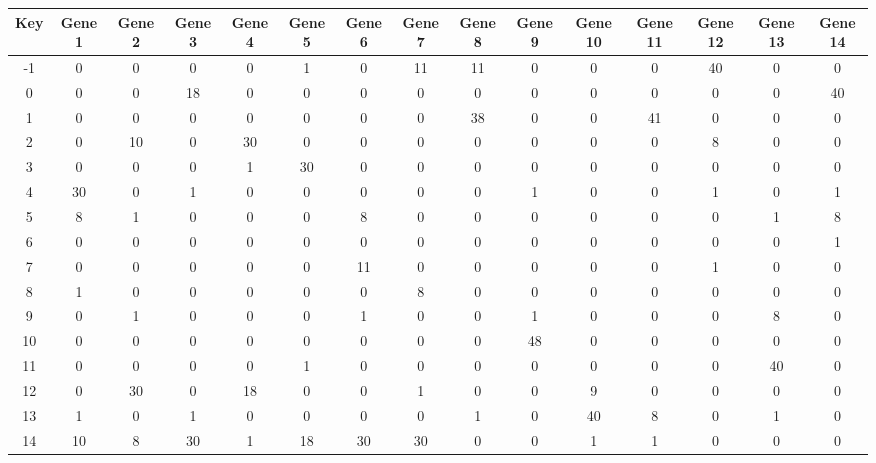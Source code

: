 \begin{tabular}{|c|c|c|c|c|c|c|c|c|c|c|c|c|c|c|}
\hline
Key & Gene 1 & Gene 2 & Gene 3 & Gene 4 & Gene 5 & Gene 6 & Gene 7 & Gene 8 & Gene 9 & Gene 10 & Gene 11 & Gene 12 & Gene 13 & Gene 14 \\
\hline
-1 & 0 & 0 & 0 & 0 & 1 & 0 & 11 & 11 & 0 & 0 & 0 & 40 & 0 & 0 \\
0 & 0 & 0 & 18 & 0 & 0 & 0 & 0 & 0 & 0 & 0 & 0 & 0 & 0 & 40 \\
1 & 0 & 0 & 0 & 0 & 0 & 0 & 0 & 38 & 0 & 0 & 41 & 0 & 0 & 0 \\
2 & 0 & 10 & 0 & 30 & 0 & 0 & 0 & 0 & 0 & 0 & 0 & 8 & 0 & 0 \\
3 & 0 & 0 & 0 & 1 & 30 & 0 & 0 & 0 & 0 & 0 & 0 & 0 & 0 & 0 \\
4 & 30 & 0 & 1 & 0 & 0 & 0 & 0 & 0 & 1 & 0 & 0 & 1 & 0 & 1 \\
5 & 8 & 1 & 0 & 0 & 0 & 8 & 0 & 0 & 0 & 0 & 0 & 0 & 1 & 8 \\
6 & 0 & 0 & 0 & 0 & 0 & 0 & 0 & 0 & 0 & 0 & 0 & 0 & 0 & 1 \\
7 & 0 & 0 & 0 & 0 & 0 & 11 & 0 & 0 & 0 & 0 & 0 & 1 & 0 & 0 \\
8 & 1 & 0 & 0 & 0 & 0 & 0 & 8 & 0 & 0 & 0 & 0 & 0 & 0 & 0 \\
9 & 0 & 1 & 0 & 0 & 0 & 1 & 0 & 0 & 1 & 0 & 0 & 0 & 8 & 0 \\
10 & 0 & 0 & 0 & 0 & 0 & 0 & 0 & 0 & 48 & 0 & 0 & 0 & 0 & 0 \\
11 & 0 & 0 & 0 & 0 & 1 & 0 & 0 & 0 & 0 & 0 & 0 & 0 & 40 & 0 \\
12 & 0 & 30 & 0 & 18 & 0 & 0 & 1 & 0 & 0 & 9 & 0 & 0 & 0 & 0 \\
13 & 1 & 0 & 1 & 0 & 0 & 0 & 0 & 1 & 0 & 40 & 8 & 0 & 1 & 0 \\
14 & 10 & 8 & 30 & 1 & 18 & 30 & 30 & 0 & 0 & 1 & 1 & 0 & 0 & 0 \\
\hline
\end{tabular}